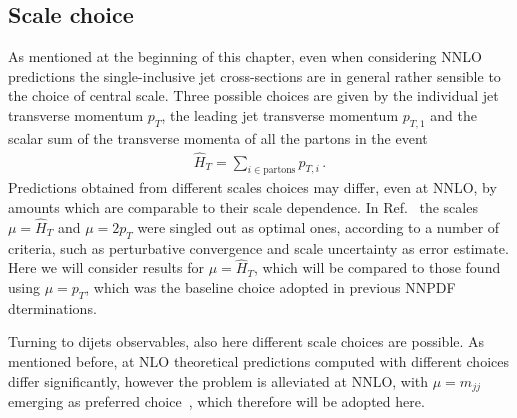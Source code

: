 \subsection{Scale choice}
As mentioned at the beginning of this chapter, even when considering NNLO predictions
the single-inclusive jet cross-sections are in general
rather sensible to the choice of central scale.
Three possible choices are given by the individual jet transverse momentum $p_T$, 
the leading jet transverse momentum $p_{T,1}$ and the scalar sum of the transverse momenta of all the partons
in the event 
\begin{align}
    \hat{H}_T = \sum_{i\in\text{partons}} p_{T,i}\,.
\end{align}
Predictions obtained from different scales choices may differ, even at NNLO, by amounts which are comparable to their
scale dependence.
In Ref.~\cite{Currie:2018xkj} the scales $\mu = \hat{H}_T $ and $\mu = 2p_T$ were singled out as optimal ones,
according to a number of criteria, such as perturbative convergence and scale uncertainty as error estimate.
Here we will consider results for $\mu = \hat{H}_T$, which will be compared to those found using $\mu=p_T$,
which was the baseline choice adopted in previous NNPDF dterminations.

%
Turning to dijets observables, also here different scale choices are possible. As mentioned before, at NLO theoretical predictions
computed with different choices differ significantly, however the problem is alleviated at NNLO, with $\mu = m_{jj}$
emerging as preferred choice~\cite{Currie:2017eqf,Currie:2018oxh}, which therefore will be adopted here. 

